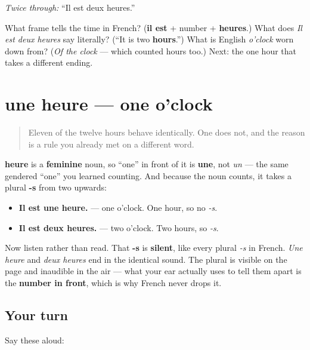 \emph{Twice through:} \textquotedblleft{}Il est deux heures.\textquotedblright{}

\begin{tcolorbox}[breakable,colback=teal!4,colframe=teal!35!black,title={Before you move on}]
What frame tells the time in French? (\textbf{il est} + number + \textbf{heures}.) What does \emph{Il est deux heures} say literally? (\textquotedblleft{}It is two \textbf{hours}.\textquotedblright{}) What is English \emph{o'clock} worn down from? (\emph{Of the clock} — which counted hours too.) Next: the one hour that takes a different ending.
\end{tcolorbox}
\section[une heure]{une heure — one o'clock}

\label{lesson:FR-C08-une-heure}



\begin{quote}
Eleven of the twelve hours behave identically. One does not, and the reason is a rule you already met on a different word.
\end{quote}

\begin{grammarlens}[title={Grammar Lens: one hour, two hours}]
\textbf{heure} is a \textbf{feminine} noun, so \textquotedblleft{}one\textquotedblright{} in front of it is \textbf{une}, not \emph{un} — the same gendered \textquotedblleft{}one\textquotedblright{} you learned counting. And because the noun counts, it takes a plural \textbf{-s} from two upwards:

\begin{itemize}
\raggedright
  \item \textbf{Il est une heure.} — one o'clock. One hour, so no \emph{-s}.
  \item \textbf{Il est deux heures.} — two o'clock. Two hours, so \emph{-s}.
\end{itemize}

Now listen rather than read. That \textbf{-s} is \textbf{silent}, like every plural \emph{-s} in French. \emph{Une heure} and \emph{deux heures} end in the identical sound. The plural is visible on the page and inaudible in the air — what your ear actually uses to tell them apart is the \textbf{number in front}, which is why French never drops it.
\end{grammarlens}

\subsection*{Your turn}
Say these aloud:

